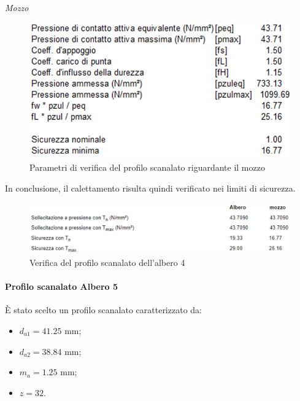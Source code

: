\emph{Mozzo}
\begin{figure}[h]
    \centering
    \includegraphics[scale=0.5]{Immagini/RisultatiScanalatoMozzo4.png}
    \caption{Parametri di verifica del profilo scanalato riguardante il mozzo}
    \label{fig:RisultatiScanalatoMozzo4}
\end{figure}
\newpage
In conclusione, il calettamento risulta quindi verificato nei limiti di sicurezza.
\begin{figure}[h]
    \centering
    \includegraphics[scale=0.5]{Immagini/RisultatiScanalato4.png}
    \caption{Verifica del profilo scanalato dell'albero 4}
    \label{fig:RisultatiScanalato4}
\end{figure}

\paragraph{Profilo scanalato Albero 5}

È stato scelto un profilo scanalato caratterizzato da:
\begin{itemize}
    \item $d_{a1}=41.25$ mm;
    \item $d_{a2}=38.84$ mm;
    \item $m_a=1.25$ mm;
    \item $z=32$.
\end{itemize}

